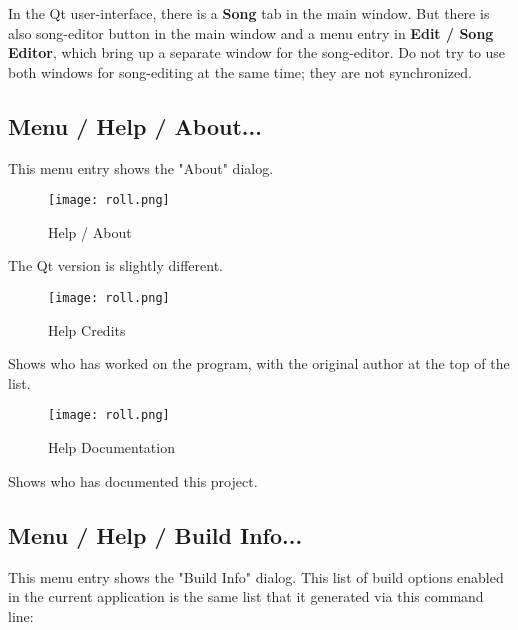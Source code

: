    In the Qt user-interface, there is a \textbf{Song} tab in the main window.
   But there is also song-editor button in the main window
   and a menu entry in \textbf{Edit / Song Editor},
   which bring up a separate window for the song-editor.
   Do not try to use both windows for song-editing at the same time; they
   are not synchronized.

\subsection{Menu / Help / About...}
\label{subsec:seq66_menu_about}

   This menu entry shows the "About" dialog.

\begin{figure}[H]
   \centering 
   \texttt{[image: roll.png]}
   \caption{Help / About}
   \label{fig:seq66_menu_help_about}
\end{figure}

   The Qt version is slightly different.

\begin{figure}[H]
   \centering 
   \texttt{[image: roll.png]}
   \caption{Help Credits}
   \label{fig:seq66_menu_help_credits}
\end{figure}

   Shows who has worked on the program, with the original author at the top
   of the list.

\begin{figure}[H]
   \centering 
   \texttt{[image: roll.png]}
   \caption{Help Documentation}
   \label{fig:seq66_menu_help_doc}
\end{figure}

   Shows who has documented this project.

\subsection{Menu / Help / Build Info...}
\label{subsec:seq66_menu_build_info}

   This menu entry shows the "Build Info" dialog.  This list of
   build options enabled in the current application is the same list
   that it generated via this command line:

